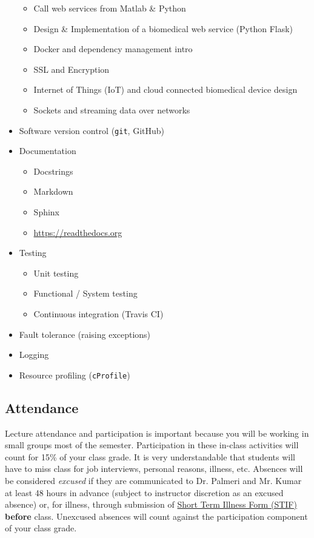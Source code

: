 \begin{multicols}{2}
\begin{itemize}
\begin{itemize}
        \item Call web services from Matlab \& Python
        \item Design \& Implementation of a biomedical web service (Python Flask)
        \item Docker and dependency management intro
        \item SSL and Encryption
        \item Internet of Things (IoT) and cloud connected biomedical device design
        \item Sockets and streaming data over networks
    \end{itemize}
    \item Software version control (\verb+git+, GitHub)
    \item Documentation
    \begin{itemize}
        \item Docstrings
        \item Markdown
        \item Sphinx
        \item \url{https://readthedocs.org}
    \end{itemize}
    \item Testing
    \begin{itemize}
        \item Unit testing
        \item Functional / System testing
        \item Continuous integration (Travis CI)
    \end{itemize}
    \item Fault tolerance (raising exceptions)
    \item Logging
    \item Resource profiling (\verb+cProfile+)
\end{itemize}
\end{multicols}

\subsection*{Attendance}
Lecture attendance and participation is important because you will be working in small groups most of the semester.  Participation in these in-class activities will count for 15\% of
your class grade.  It is very understandable that students will have to miss
class for job interviews, personal reasons, illness, etc.  Absences will
be considered \emph{excused} if they are communicated to Dr. Palmeri and Mr. Kumar at least
48 hours in advance (subject to instructor discretion as an excused absence) or, for illness, through submission of
\href{http://www.pratt.duke.edu/undergrad/policies/3531}{Short Term Illness
    Form (STIF)} {\bf before} class.  Unexcused absences will count
against the participation component of your class grade.


